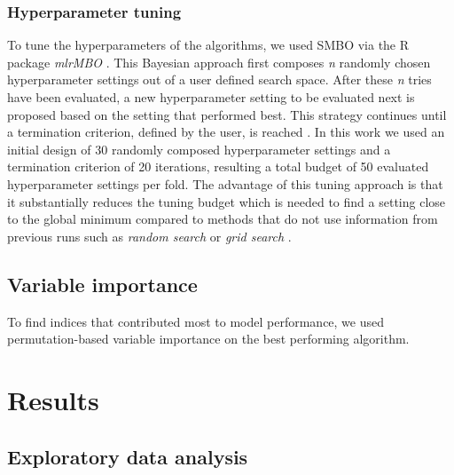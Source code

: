 \documentclass[review]{elsarticle}
\begin{document}

\subsubsection{Hyperparameter tuning}
To tune the hyperparameters of the algorithms, we used \ac{SMBO} via the R package \textit{mlrMBO} \citep{mlrMBO}.
This Bayesian approach first composes \textit{n} randomly chosen hyperparameter settings out of a user defined search space.
After these \textit{n} tries have been evaluated, a new hyperparameter setting to be evaluated next is proposed based on the setting that performed best.
This strategy continues until a termination criterion, defined by the user, is reached \citep{Hutter2011, Jones1998}.
In this work we used an initial design of 30 randomly composed hyperparameter settings and a termination criterion of 20 iterations, resulting a total budget of 50 evaluated hyperparameter settings per fold.
The advantage of this tuning approach is that it substantially reduces the tuning budget which is needed to find a setting close to the global minimum compared to methods that do not use information from previous runs such as \textit{random search} or \textit{grid search} \citep{Bergstra2012}.

\subsection{Variable importance}

To find indices that contributed most to model performance, we used permutation-based variable importance on the best performing algorithm.


\section{Results}

\subsection{Exploratory data analysis}
\end{document}
